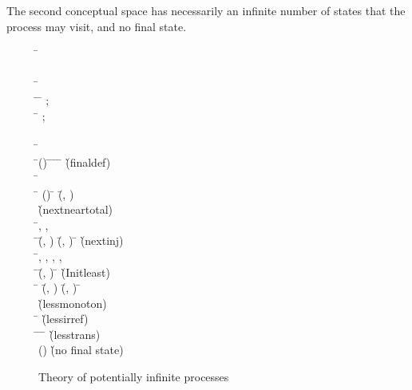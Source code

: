 The second conceptual space has necessarily an infinite number
of states that the process may visit, and no final state.

\begin{figure}[ht!]
\begin{hetcasl}
  \SPEC \= \Ax{=}\\
\> \SORT {}\\
\> \OP \= \Ax{:} \\
\> \PREDS \= \Ax{:} \= \Ax{\times} ;\\
\>\> \Ax{\_\_}\Ax{<}\Ax{\_\_} \Ax{:} \= \Ax{\times} ;\\
\>\>  \Ax{:} \\
\> \Ax{\forall} \= \Ax{:}  \\
\> \Ax{\bullet} \=() \Ax{\Leftrightarrow} \=\Ax{\forall}  \Ax{:}  \Ax{\bullet} \=\Ax{\neg} \= \Ax{=}  \Ax{\Rightarrow} \= \Ax{<}  \`{\small{}\KW{\%}(final\Ax{\_}def)\KW{\%}}\\
\> \Ax{\forall} \= \Ax{:}  \\
\> \Ax{\bullet} \=\Ax{\neg} () \Ax{\Rightarrow} \=\Ax{\exists!}  \Ax{:}  \Ax{\bullet} (\=, ) \\
\> \`{\small{}\KW{\%}(next\Ax{\_}near\Ax{\_}total)\KW{\%}}\\
\> \Ax{\forall} \=, ,  \Ax{:}  \\
\> \Ax{\bullet} \=(\=, ) \Ax{\wedge} (\=, ) \Ax{\Rightarrow} \= \Ax{=}  \`{\small{}\KW{\%}(next\Ax{\_}inj)\KW{\%}}\\
\> \Ax{\forall} \=, , , ,  \Ax{:}  \\
\> \Ax{\bullet} \=(\=, ) \Ax{\Rightarrow} \= \Ax{<}  \`{\small{}\KW{\%}(Init\Ax{\_}least)\KW{\%}}\\
\> \Ax{\bullet} \= \Ax{<}  \Ax{\wedge} (\=, ) \Ax{\wedge} (\=, ) \Ax{\Rightarrow} \= \Ax{<}  \\
\> \`{\small{}\KW{\%}(less\Ax{\_}monoton)\KW{\%}}\\
\> \Ax{\bullet} \Ax{\neg} \= \Ax{<}  \`{\small{}\KW{\%}(less\Ax{\_}irref)\KW{\%}}\\
\> \Ax{\bullet} \= \Ax{<}  \Ax{\wedge} \= \Ax{<}  \Ax{\Rightarrow} \= \Ax{<}  \`{\small{}\KW{\%}(less\Ax{\_}trans)\KW{\%}}\\
\> \Ax{\bullet} \Ax{\neg} () \`{\small{}\KW{\%}(no final state)\KW{\%}}\\
\end{hetcasl}
\caption{Theory of potentially infinite processes}
  \label{fig:pot_inf}
\end{figure}

